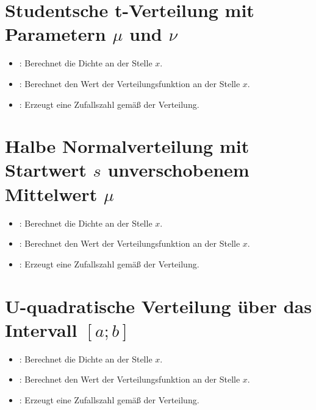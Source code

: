 \section{Studentsche t-Verteilung mit Parametern \texorpdfstring{$\mu$}{mu} und \texorpdfstring{$\nu$}{nu}}

\begin{itemize}

\item
{}:
Berechnet die Dichte an der Stelle $x$.

\item
{}:
Berechnet den Wert der Verteilungsfunktion an der Stelle $x$.

\item
{}:
Erzeugt eine Zufallszahl gemäß der Verteilung.

\end{itemize}



\section{Halbe Normalverteilung mit Startwert \texorpdfstring{$s$}{s} unverschobenem Mittelwert \texorpdfstring{$\mu$}{mu}}

\begin{itemize}

\item
{}:
Berechnet die Dichte an der Stelle $x$.

\item
{}:
Berechnet den Wert der Verteilungsfunktion an der Stelle $x$.

\item
{}:
Erzeugt eine Zufallszahl gemäß der Verteilung.

\end{itemize}



\section{U-quadratische Verteilung über das Intervall \texorpdfstring{$[a;b]$}{[a;b]}}

\begin{itemize}

\item
{}:
Berechnet die Dichte an der Stelle $x$.

\item
{}:
Berechnet den Wert der Verteilungsfunktion an der Stelle $x$.

\item
{}:
Erzeugt eine Zufallszahl gemäß der Verteilung.

\end{itemize}




